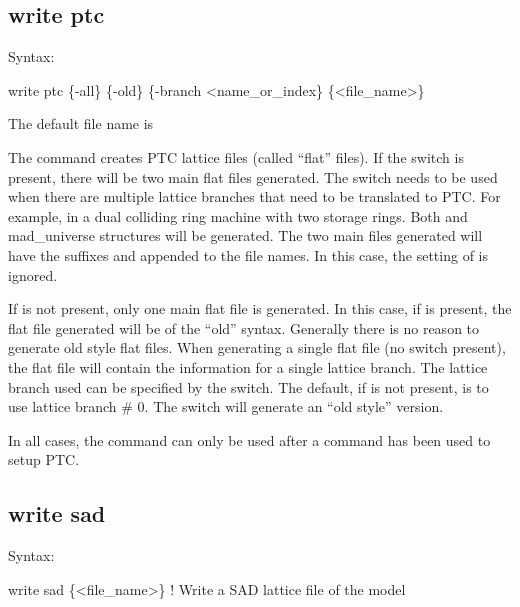 {{{{{{{{{{{%

\subsection{write ptc}
\label{s:write.ptc}

Syntax:
\begin{example}
  write ptc \{-all\} \{-old\} \{-branch <name_or_index\} \{<file_name>\}
\end{example}

The default file name is 

The  command creates PTC lattice files (called ``flat'' files).  If the 
switch is present, there will be two main flat files generated. The  switch needs to be
used when there are multiple lattice branches that need to be translated to PTC. For example, in a
dual colliding ring machine with two storage rings. Both  and  mad_universe
structures will be generated. The two main files generated will have the suffixes  and
 appended to the file names. In this case, the setting of  is ignored.

If  is not present, only one main flat file is generated. In this case, if  is
present, the flat file generated will be of the ``old'' syntax. Generally there is no reason to
generate old style flat files. When generating a single flat file (no  switch present), the
flat file will contain the information for a single lattice branch. The lattice branch used can be
specified by the  switch. The default, if  is not present, is to use lattice
branch \# 0. The  switch will generate an ``old style'' version.

In all cases, the  command can only be used after a  command has been
used to setup PTC.


\subsection{write sad}
\label{s:write.sad}

Syntax:
\begin{example}
  write sad \{<file_name>\}  ! Write a SAD lattice file of the model
\end{example}

}}}}}}}}}}}
